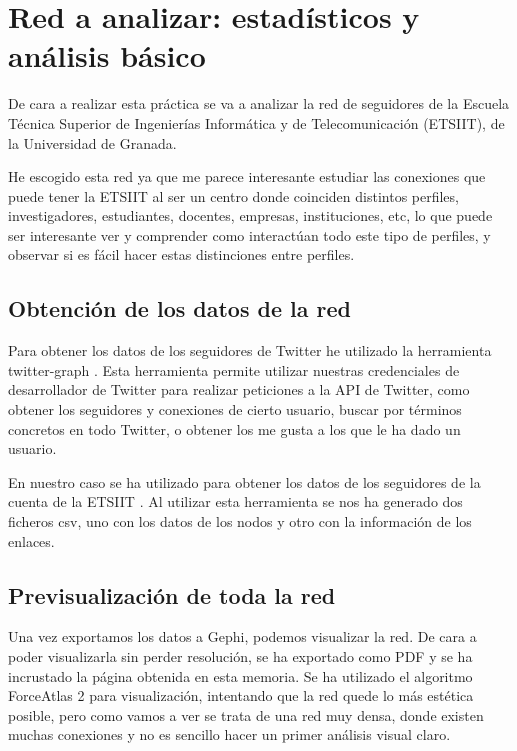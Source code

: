 \section{Red a analizar: estadísticos y análisis básico}

De cara a realizar esta práctica se va a analizar la red de seguidores de la Escuela Técnica Superior de Ingenierías Informática y de Telecomunicación (ETSIIT), de la Universidad de Granada.

He escogido esta red ya que me parece interesante estudiar las conexiones que puede tener la ETSIIT al ser un centro donde coinciden distintos perfiles, investigadores, estudiantes, docentes, empresas, instituciones, etc, lo que puede ser interesante ver y comprender como interactúan todo este tipo de perfiles, y observar si es fácil hacer estas distinciones entre perfiles.

\subsection{Obtención de los datos de la red}

Para obtener los datos de los seguidores de Twitter he utilizado la herramienta twitter-graph \cite{twitterGraph}. Esta herramienta permite utilizar nuestras credenciales de desarrollador de Twitter para realizar peticiones a la API de Twitter, como obtener los seguidores y conexiones de cierto usuario, buscar por términos concretos en todo Twitter, o obtener los me gusta a los que le ha dado un usuario.

En nuestro caso se ha utilizado para obtener los datos de los seguidores de la cuenta de la ETSIIT \cite{twitterETSIIT}. Al utilizar esta herramienta se nos ha generado dos ficheros csv, uno con los datos de los nodos y otro con la información de los enlaces.

\subsection{Previsualización de toda la red}

Una vez exportamos los datos a Gephi, podemos visualizar la red. De cara a poder visualizarla sin perder resolución, se ha exportado como PDF y se ha incrustado la página obtenida en esta memoria. Se ha utilizado el algoritmo ForceAtlas 2 para visualización, intentando que la red quede lo más estética posible, pero como vamos a ver se trata de una red muy densa, donde existen muchas conexiones y no es sencillo hacer un primer análisis visual claro.

